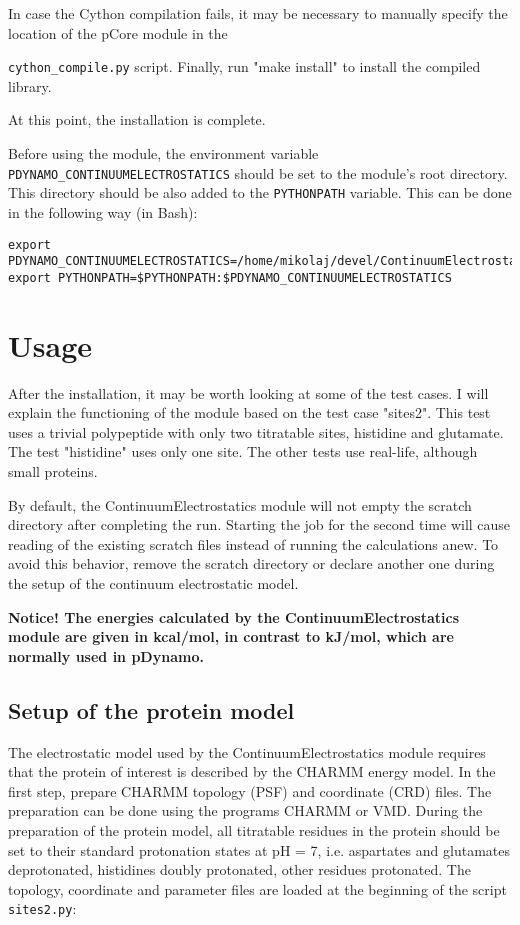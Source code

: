 \documentclass[a4paper,11pt]{article}
\newcommand{\modulename}{ContinuumElectrostatics\xspace}
\begin{document}
In case the Cython compilation fails, it may be necessary to manually specify the location of the pCore module in the {\texttt{cython\_compile.py} script.
%
Finally, run "make install" to install the compiled library.

\bigskip
At this point, the installation is complete.

\bigskip
Before using the module, the environment variable \texttt{PDYNAMO\_CONTINUUMELECTROSTATICS} 
should be set to the module's root directory.
%
This directory should be also added to the \texttt{PYTHONPATH} variable. 
%
This can be done in the following way (in Bash):

{\footnotesize \begin{lstlisting}
export PDYNAMO_CONTINUUMELECTROSTATICS=/home/mikolaj/devel/ContinuumElectrostatics
export PYTHONPATH=$PYTHONPATH:$PDYNAMO_CONTINUUMELECTROSTATICS
\end{lstlisting} }


\section{Usage}
After the installation, it may be worth looking at some of the test cases.
%
I will explain the functioning of the module based on the test case "sites2".
%
This test uses a trivial polypeptide with only two titratable sites,
histidine and glutamate.
%
The test "histidine" uses only one site. The other tests use real-life,
although small proteins.


By default, the \modulename module will not empty the scratch directory
after completing the run.
%
Starting the job for the second time will cause reading of the existing 
scratch files instead of running the calculations anew.
%
To avoid this behavior, remove the scratch directory or declare another one
during the setup of the continuum electrostatic model.

\textbf{Notice! The energies calculated by the \modulename module are 
given in kcal/mol, in contrast to kJ/mol, which are normally used 
in pDynamo.}


\subsection{Setup of the protein model}
The electrostatic model used by the \modulename module requires that the protein
of interest is described by the CHARMM energy model\cite{MacKerell1998}.
%
In the first step, prepare CHARMM topology (PSF) and coordinate (CRD) files.
%
The preparation can be done using the programs CHARMM\cite{CHARMM_Brooks1983}
or VMD\cite{VMD1996}.
%
During the preparation of the protein model, all titratable residues in the protein
should be set to their standard protonation states at pH = 7, i.e. aspartates
and glutamates deprotonated, histidines doubly protonated, other residues
protonated.
%
The topology, coordinate and parameter files are loaded at the
beginning of the script \texttt{sites2.py}:

}
\end{document}
